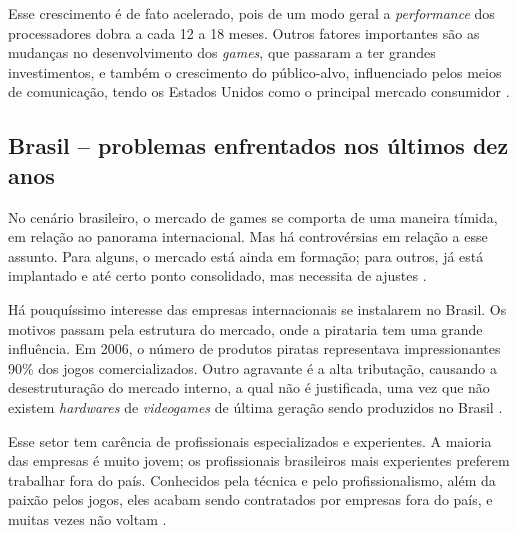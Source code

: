 Esse crescimento é de fato acelerado, pois de um modo geral a \textit{performance} dos processadores dobra a cada 12 a 18 meses. Outros fatores importantes são as mudanças no desenvolvimento dos \textit{games}, que passaram a ter grandes investimentos, e também o crescimento do público-alvo, influenciado pelos meios de comunicação, tendo os Estados Unidos como o principal mercado consumidor \cite{GEDIGames}.
%
%
\subsection{Brasil -- problemas enfrentados nos últimos dez anos}
%
No cenário brasileiro, o mercado de games se comporta de uma maneira tímida, em relação ao panorama internacional. Mas há controvérsias em relação a esse assunto. Para alguns, o mercado está ainda em formação; para outros, já está implantado e até certo ponto consolidado, mas necessita de ajustes \cite{GEDIGames}.

Há pouquíssimo interesse das empresas internacionais se instalarem no Brasil. Os motivos passam pela estrutura do mercado, onde a pirataria tem uma grande influência. Em 2006, o número de produtos piratas representava impressionantes 90\% dos jogos comercializados. Outro agravante é a alta tributação, causando a desestruturação do mercado interno, a qual não é justificada, uma vez que não existem \textit{hardwares} de \textit{videogames} de última geração sendo produzidos no Brasil \cite{GEDIGames}.

Esse setor tem carência de profissionais especializados e experientes. A maioria das empresas é muito jovem; os profissionais brasileiros mais experientes preferem trabalhar fora do país. Conhecidos pela técnica e pelo profissionalismo, além da paixão pelos jogos, eles acabam sendo contratados por empresas fora do país, e muitas vezes não voltam \cite{GEDIGames}.
%
